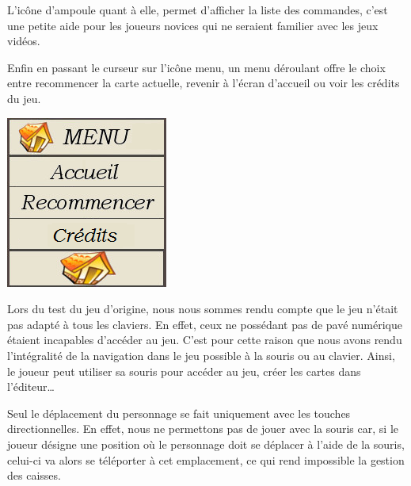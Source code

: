 \documentclass[english,11pt]{report}
\begin{document}
\vspace{0.2cm}
L’icône d’ampoule quant à elle, permet d’afficher la liste des commandes, c’est une petite aide pour les joueurs novices qui ne seraient familier avec les jeux vidéos.\par
\vspace{0.2cm}
Enfin en passant le curseur sur l’icône menu, un menu déroulant offre le choix entre recommencer la carte actuelle, revenir à l’écran d’accueil ou voir les crédits du jeu.\par
\vspace{0.5cm}
\begin{center}
\includegraphics[scale=0.8]{MenuD}
\end{center}
\vspace{0.2cm}
\par
Lors du test du jeu d’origine, nous nous sommes rendu compte que le jeu n’était pas adapté à tous les claviers. En effet, ceux ne possédant pas de pavé numérique étaient incapables d’accéder au jeu. C’est pour cette raison que nous avons rendu l’intégralité de la navigation dans le jeu possible à la souris ou au clavier. Ainsi, le joueur peut utiliser sa souris pour accéder au jeu, créer les cartes dans l’éditeur…\par
\vspace{0.2cm}
Seul le déplacement du personnage se fait uniquement avec les touches directionnelles. En effet, nous ne permettons pas de jouer avec la souris car, si le joueur désigne une position où le personnage doit se déplacer à l’aide de la souris, celui-ci va alors se téléporter à cet emplacement, ce qui rend impossible la gestion des caisses.\par
\vspace{0.5cm}
\end{document}
